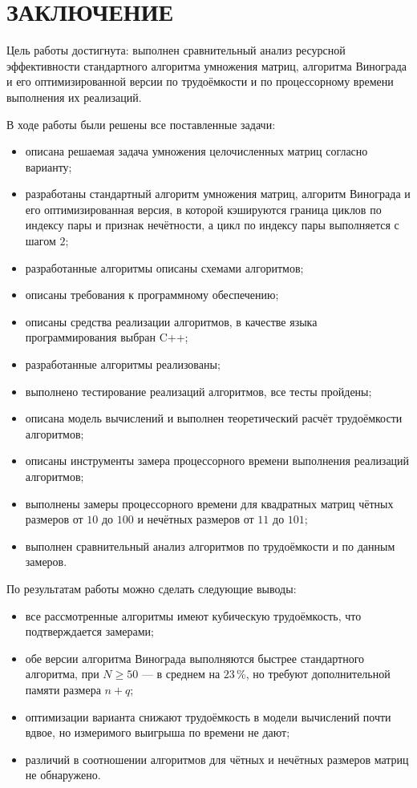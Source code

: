 \documentclass{bmstu}
\begin{document}
\chapter*{ЗАКЛЮЧЕНИЕ}

Цель работы достигнута: выполнен сравнительный анализ ресурсной
эффективности стандартного алгоритма умножения матриц, алгоритма Винограда и
его оптимизированной версии по трудоёмкости и по процессорному времени
выполнения их реализаций.

В ходе работы были решены все поставленные задачи:
\begin{itemize}
	\item описана решаемая задача умножения целочисленных матриц согласно
	      варианту;
	\item разработаны стандартный алгоритм умножения матриц, алгоритм
	      Винограда и его оптимизированная версия, в которой кэшируются
	      граница циклов по индексу пары и признак нечётности, а цикл по
	      индексу пары выполняется с шагом $2$;
	\item разработанные алгоритмы описаны схемами алгоритмов;
	\item описаны требования к программному обеспечению;
	\item описаны средства реализации алгоритмов, в качестве языка
	      программирования выбран C++;
	\item разработанные алгоритмы реализованы;
	\item выполнено тестирование реализаций алгоритмов, все тесты
	      пройдены;
	\item описана модель вычислений и выполнен теоретический расчёт
	      трудоёмкости алгоритмов;
	\item описаны инструменты замера процессорного времени выполнения
	      реализаций алгоритмов;
	\item выполнены замеры процессорного времени для квадратных матриц
	      чётных размеров от $10$ до $100$ и нечётных размеров от $11$ до
	      $101$;
	\item выполнен сравнительный анализ алгоритмов по трудоёмкости и по
	      данным замеров.
\end{itemize}

По результатам работы можно сделать следующие выводы:
\begin{itemize}
	\item все рассмотренные алгоритмы имеют кубическую трудоёмкость, что
	      подтверждается замерами;
	\item обе версии алгоритма Винограда выполняются быстрее стандартного
	      алгоритма, при $N \ge 50$ --- в среднем на $23$\,\%, но требуют
	      дополнительной памяти размера $n+q$;
	\item оптимизации варианта снижают трудоёмкость в модели вычислений
	      почти вдвое, но измеримого выигрыша по времени не дают;
	\item различий в соотношении алгоритмов для чётных и нечётных размеров
	      матриц не обнаружено.
\end{itemize}
\end{document}
